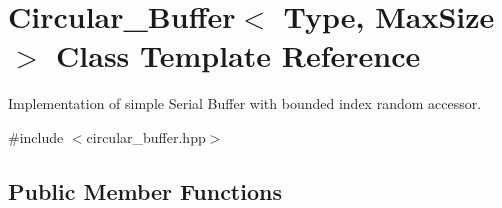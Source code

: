 \hypertarget{classCircular__Buffer}{}\section{Circular\+\_\+\+Buffer$<$ Type, Max\+Size $>$ Class Template Reference}
\label{classCircular__Buffer}


Implementation of simple Serial Buffer with bounded index random accessor.  




{\ttfamily \#include $<$circular\+\_\+buffer.\+hpp$>$}

\subsection*{Public Member Functions}

